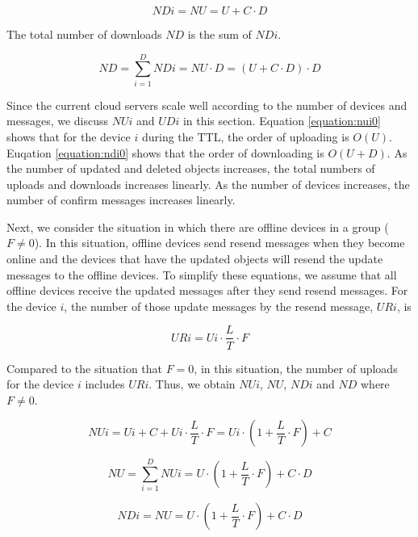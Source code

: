 \documentclass[a4paper,11pt]{report}
\begin{document}
\begin{equation}
NDi = NU = U + C \cdot D
\label{equation:ndi0}
\end{equation}

The total number of downloads $ND$ is the sum of $NDi$.

\begin{equation}
ND = \sum_{i = 1}^{D} NDi = NU \cdot D =  (U + C \cdot D) \cdot D
\label{equation:nd0}
\end{equation}

Since the current cloud servers scale well according to the number of devices and messages, we discuss $NUi$ and $UDi$ in this section.
Equation \ref{equation:nui0} shows that for the device $i$ during the TTL, the order of uploading is $O(U)$.
Euqation \ref{equation:ndi0} shows that the order of downloading is $O(U+D)$.
As the number of updated and deleted objects increases, the total numbers of uploads and downloads increases linearly.
As the number of devices increases, the number of confirm messages increases linearly.

Next, we consider the situation in which there are offline devices in a group ($F \neq 0$).
In this situation, offline devices send resend messages when they become online and the devices that have the updated objects will resend the update messages to the offline devices.
To simplify these equations, we assume that all offline devices receive the updated messages after they send resend messages.
For the device $i$, the number of those update messages by the resend message, $URi$, is

\begin{equation}
URi = Ui \cdot \frac{L}{T} \cdot F
\label{equation:uri}
\end{equation}

Compared to the situation that $F=0$, in this situation, the number of uploads for the device $i$ includes $URi$.
Thus, we obtain $NUi$, $NU$, $NDi$ and $ND$ where $F \neq 0$.

\begin{equation}
NUi = Ui + C + Ui \cdot \frac{L}{T} \cdot F = Ui \cdot (1 + \frac{L}{T} \cdot F) + C
\label{equation:nui}
\end{equation}

\begin{equation}
NU = \sum_{i = 1}^{D} NUi = U \cdot (1 + \frac{L}{T} \cdot F) + C \cdot D
\label{equation:nu}
\end{equation}

\begin{equation}
NDi = NU = U \cdot (1 + \frac{L}{T} \cdot F) + C \cdot D
\label{equation:ndi}
\end{equation}
\end{document}
